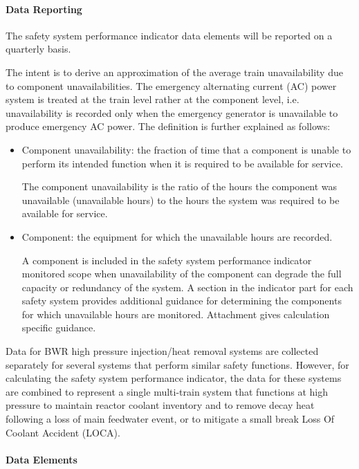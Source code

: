 \paragraph{Data Reporting}
The safety system performance indicator data elements will be reported
on a quarterly basis.

The intent is to derive an approximation of the average train
unavailability due to component unavailabilities. The emergency
alternating current (AC) power system is treated at the train level
rather at the component level, i.e. unavailability is recorded only
when the emergency generator is unavailable to produce emergency AC
power. The definition is further explained as follows:
\begin{itemize}
\item Component unavailability: the fraction of time that a component
  is unable to perform its intended function when it is required to be
  available for service.

The component unavailability is the ratio of the hours the component
was unavailable (unavailable hours) to the hours the system was
required to be available for service.

\item Component: the equipment for which the unavailable hours are
  recorded.

A component is included in the safety system performance indicator
monitored scope when unavailability of the component can degrade the
full capacity or redundancy of the system. A section in the indicator
part for each safety system provides additional guidance for
determining the components for which unavailable hours are
monitored. Attachment gives calculation specific guidance.
\end{itemize}

Data for BWR high pressure injection/heat removal systems are
collected separately for several systems that perform similar safety
functions. However, for calculating the safety system performance
indicator, the data for these systems are combined to represent a
single multi-train system that functions at high pressure to maintain
reactor coolant inventory and to remove decay heat following a loss of
main feedwater event, or to mitigate a small break Loss Of Coolant
Accident (LOCA).

\paragraph{Data Elements}

